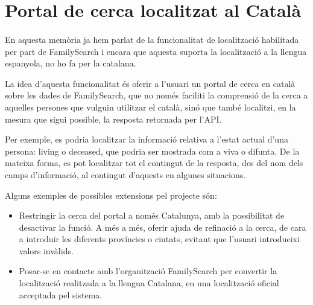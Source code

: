 \section{Portal de cerca localitzat al Català}

    \paragraph{}
    En aquesta memòria ja hem parlat de la funcionalitat de localització habilitada per part de FamilySearch i encara que aquesta suporta la localització a la llengua espanyola, no ho fa per la catalana.

    La idea d'aquesta funcionalitat és oferir a l'usuari un portal de cerca en català sobre les dades de FamilySearch, que no només faciliti la comprensió de la cerca a aquelles persones que vulguin utilitzar el català, sinó que també localitzi, en la mesura que sigui possible, la resposta retornada per l'API.

    Per exemple, es podria localitzar la informació relativa a l'estat actual d'una persona: living o deceased, que podria ser mostrada com a viva o difunta. De la mateixa forma, es pot localitzar tot el contingut de la resposta, des del nom dels camps d'informació, al contingut d'aquests en algunes situacions.

    Alguns exemples de possibles extensions pel projecte són:

    \begin{itemize}
        \item Restringir la cerca del portal a només Catalunya, amb la possibilitat de desactivar la funció. A més a més, oferir ajuda de refinació a la cerca, de cara a introduir les diferents províncies o ciutats, evitant que l'usuari introdueixi valors invàlids.
        \item Posar-se en contacte amb l'organització FamilySearch per convertir la localització realitzada a la llengua Catalana, en una localització oficial acceptada pel sistema.
    \end{itemize}
